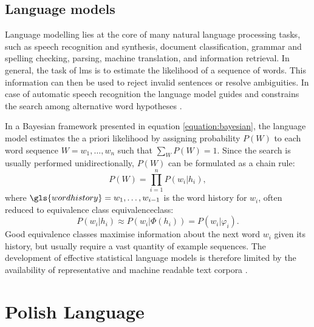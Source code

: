 \subsection{Language models}
\label{subsection:lm}
Language modelling lies at the core of many natural language processing tasks, such as speech recognition and synthesis, document classification, grammar and spelling checking, parsing, machine translation, and information retrieval. In general, the task of \glspl{lm} is to estimate the likelihood of a sequence of words. This information can then be used to reject invalid sentences or resolve ambiguities. In case of automatic speech recognition the language model guides and constrains the search among alternative word hypotheses \cite{glass2013automatic}.

In a Bayesian framework presented in equation \ref{equation:bayesian}, the language model estimates the a priori likelihood by assigning probability $P(W)$ to each word sequence $W=w_{1}, \ldots, w_{n}$ such that $\sum_{W}P(W)=1$. Since the search is usually performed unidirectionally, $P(W)$ can be formulated as a chain rule:
\begin{equation}
\label{equation:chain}
  P(W)=\prod^{n}_{i=1}P(w_{i}|h_{i}),
\end{equation}
where $\gls{wordhistory}=w_{1}, \ldots, w_{i-1}$ is the word history for $w_{i}$, often reduced to equivalence class \gls{equivalenceclass}:
\begin{equation}
	P(w_{i}|h_{i})\approx P(w_{i}|\Phi(h_{i}))=P(w_{i}|\varphi_{i}).
\end{equation}
Good equivalence classes maximise information about the next word $w_{i}$ given its history, but usually require a vast quantity of example sequences. The development of effective statistical language models is therefore limited by the availability of representative and machine readable text corpora \cite{rosenfeld2000two}.

\section{Polish Language}
\label{section:polish}
